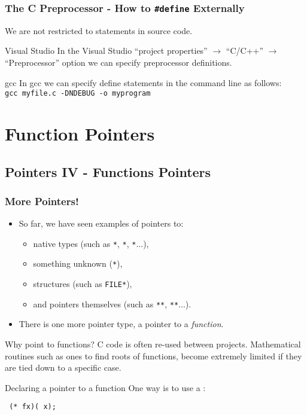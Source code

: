 \documentclass[smaller,table]{beamer} %
\begin{document}
\begin{frame}
\frametitle{The C Preprocessor - How to {\tt\#define} Externally}
We are not restricted to {\tt {}} statements in source code.
\begin{block}{Visual Studio}
In the Visual Studio ``project properties'' $\rightarrow$ ``C/C++'' $\rightarrow$ ``Preprocessor'' option we can specify preprocessor definitions.
\end{block}

\begin{block}{gcc}
In gcc we can specify define statements in the command line as follows:\\
{\tt gcc myfile.c -DNDEBUG -o myprogram }
\end{block}
\end{frame}


\section{Function Pointers}
\subsection{Pointers IV - Functions Pointers}
\begin{frame}[fragile]
\frametitle{More Pointers!}
\begin{itemize}
\item So far, we have seen examples of pointers to:
\begin{itemize}
\item native types (such as {\tt{}*}, {\tt{}*}, {\tt{}*}...),
\item something unknown ({\tt{}*}),
\item structures (such as {\tt FILE*}),
\item and pointers themselves (such as {\tt{}**}, {\tt{}**}...).
\end{itemize}
\item There is one more pointer type, a pointer to a \emph{function}.
\end{itemize}

\begin{block}{Why point to functions?}
C code is often re-used between projects. Mathematical routines such as ones to find roots of functions, become extremely limited if they are tied down to a specific case.
\end{block}

\begin{exampleblock}{Declaring a pointer to a function}
One way is to use a {\tt{}}:
\vspace{-0.1in}
\begin{center}
\tt {}  (* fx)( x);
\end{center}
\end{exampleblock}
\end{frame}
\end{document}
